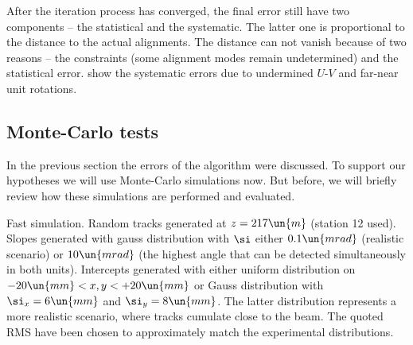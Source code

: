 After the iteration process has converged, the final error still have two components -- the statistical and the systematic. The latter one is proportional to the distance to the actual alignments. The distance can not vanish because of two reasons -- the constraints (some alignment modes remain undetermined) and the statistical error.  show the systematic errors due to undermined $U$-$V$ and far-near unit rotations. 




\subsection[al mc tests]{Monte-Carlo tests}


In the previous section the errors of the algorithm were discussed. To support our hypotheses we will use Monte-Carlo simulations now. But before, we will briefly review how these simulations are performed and evaluated.

Fast simulation. Random tracks generated at $z=217\un{m}$ (station 12 used). Slopes generated with gauss distribution with $\si$ either $0.1\un{mrad}$ (realistic scenario) or $10\un{mrad}$ (the highest angle that can be detected simultaneously in both units). Intercepts generated with either uniform distribution on $ -20\un{mm} < x, y < +20\un{mm}$ or Gauss distribution with $\si_x = 6\un{mm}$ and $\si_y = 8\un{mm}$. The latter distribution represents a more realistic scenario, where tracks cumulate close to the beam. The quoted RMS have been chosen to approximately match the experimental distributions.

